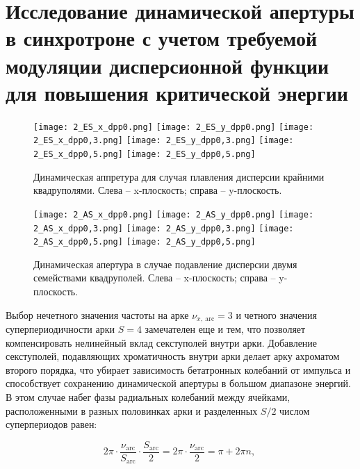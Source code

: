 \section{Исследование динамической апертуры в синхротроне с учетом требуемой модуляции дисперсионной функции для повышения критической энергии}

\begin{figure} [h!]
	\center
	\texttt{[image: 2\_ES\_x\_dpp0.png]}
	\texttt{[image: 2\_ES\_y\_dpp0.png]}
	\texttt{[image: 2\_ES\_x\_dpp0,3.png]}
	\texttt{[image: 2\_ES\_y\_dpp0,3.png]}
	\texttt{[image: 2\_ES\_x\_dpp0,5.png]}
	\texttt{[image: 2\_ES\_y\_dpp0,5.png]}
	\caption{Динамическая аппретура для случая плавления дисперсии крайними квадруполями. 
		Слева – x-плоскость; справа – y-плоскость.}
	\label{fig:DA_ES_dpp}
\end{figure}	

\begin{figure} [h!]
   \center
   \texttt{[image: 2\_AS\_x\_dpp0.png]}
   \texttt{[image: 2\_AS\_y\_dpp0.png]}
   \texttt{[image: 2\_AS\_x\_dpp0,3.png]}
   \texttt{[image: 2\_AS\_y\_dpp0,3.png]}
   \texttt{[image: 2\_AS\_x\_dpp0,5.png]}
   \texttt{[image: 2\_AS\_y\_dpp0,5.png]}
   \caption{Динамическая апертура в случае подавление дисперсии двумя семействами квадруполей.
Слева – x-плоскость; справа – y-плоскость.}
   \label{fig:DA_AS_dpp}
\end{figure}

\par Выбор нечетного значения частоты на арке $\nu_{x,\ \text{arc}}=3$ и четного значения суперпериодичности арки $S=4$ замечателен еще и тем, что позволяет компенсировать нелинейный вклад секступолей внутри арки. Добавление секступолей, подавляющих хроматичность внутри арки делает арку ахроматом второго порядка, что убирает зависимость бетатронных колебаний от импульса и способствует сохранению динамической апертуры в большом диапазоне энергий. В этом случае набег фазы радиальных колебаний между ячейками, расположенными в разных половинках арки и разделенных $S/2$ числом суперпериодов равен:

\begin{equation}
2\pi\cdot\frac{\nu_{\text{arc}}}{S_{\text{arc}}}\cdot\frac{S_{\text{arc}}}{2}=2\pi\cdot\frac{\nu_{\text{arc}}}{2}=\pi+2\pi n,\
\label{eq:chrom_period}
\end{equation}

